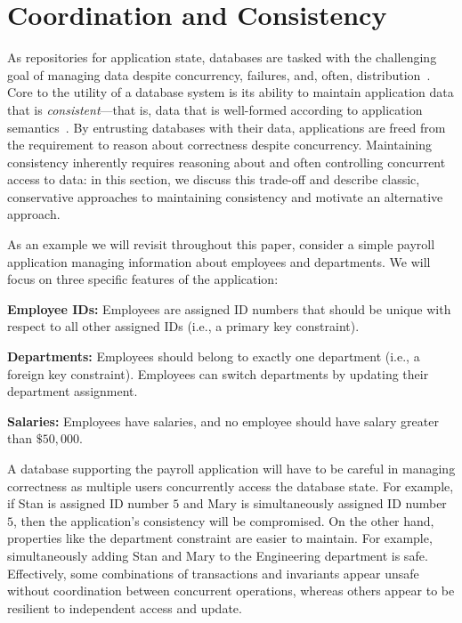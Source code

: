 
\section{Coordination and Consistency}
\label{sec:motivation}


As repositories for application state, databases are tasked with the
challenging goal of managing data despite concurrency, failures, and,
often, distribution~\cite{bernstein-book}. Core to the utility of a
database system is its ability to maintain application data that is
\textit{consistent}---that is, data that is well-formed according to
application semantics~\cite{gray-virtues}. By entrusting databases
with their data, applications are freed from the requirement to reason
about correctness despite concurrency. Maintaining consistency
inherently requires reasoning about and often controlling concurrent
access to data: in this section, we discuss this trade-off and
describe classic, conservative approaches to maintaining consistency
and motivate an alternative approach.

 As an example we will revisit throughout
this paper, consider a simple payroll application managing information
about employees and departments. We will focus on three specific
features of the application:
\begin{myitemize}
\item\textbf{Employee IDs:} Employees are assigned ID numbers that
  should be unique with respect to all other assigned IDs (i.e., a
  primary key constraint).
  \item\textbf{Departments:} Employees should belong to exactly one
  department (i.e., a foreign key constraint). Employees can switch
  departments by updating their department assignment.
\item\textbf{Salaries:} Employees have salaries, and no employee
  should have salary greater than $\$50,000$.
\end{myitemize}
A database supporting the payroll application will have to be careful
in managing correctness as multiple users concurrently access the
database state. For example, if Stan is assigned ID number $5$ and
Mary is simultaneously assigned ID number $5$, then the application's
consistency will be compromised. On the other hand, properties like
the department constraint are easier to maintain. For example,
simultaneously adding Stan and Mary to the Engineering department is
safe. Effectively, some combinations of transactions and invariants
appear unsafe without coordination between concurrent operations,
whereas others appear to be resilient to independent access and
update.


